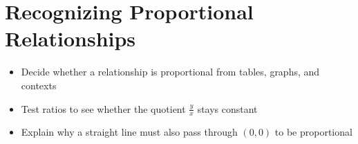 \section{Recognizing Proportional Relationships}
\setcounter{wsNumber}{0}

\begin{worksheetSkills}
\begin{itemize}
    \item Decide whether a relationship is proportional from tables, graphs, and contexts
    \item Test ratios to see whether the quotient $\frac{y}{x}$ stays constant
    \item Explain why a straight line must also pass through $(0, 0)$ to be proportional
\end{itemize}
\end{worksheetSkills}


